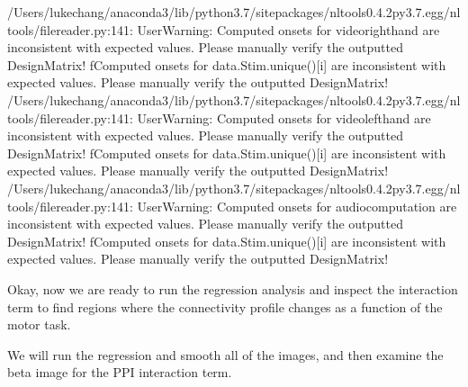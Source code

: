 \documentclass[letterpaper,10pt,english]{sphinxmanual}
\begin{document}
\begin{sphinxVerbatim}[commandchars=\\\{\}]
/Users/lukechang/anaconda3/lib/python3.7/site\PYGZhy{}packages/nltools\PYGZhy{}0.4.2\PYGZhy{}py3.7.egg/nltools/file\PYGZus{}reader.py:141: UserWarning: Computed onsets for video\PYGZus{}right\PYGZus{}hand are inconsistent with expected values. Please manually verify the outputted Design\PYGZus{}Matrix!
  f\PYGZdq{}Computed onsets for \PYGZob{}data.Stim.unique()[i]\PYGZcb{} are inconsistent with expected values. Please manually verify the outputted Design\PYGZus{}Matrix!\PYGZdq{}
/Users/lukechang/anaconda3/lib/python3.7/site\PYGZhy{}packages/nltools\PYGZhy{}0.4.2\PYGZhy{}py3.7.egg/nltools/file\PYGZus{}reader.py:141: UserWarning: Computed onsets for video\PYGZus{}left\PYGZus{}hand are inconsistent with expected values. Please manually verify the outputted Design\PYGZus{}Matrix!
  f\PYGZdq{}Computed onsets for \PYGZob{}data.Stim.unique()[i]\PYGZcb{} are inconsistent with expected values. Please manually verify the outputted Design\PYGZus{}Matrix!\PYGZdq{}
/Users/lukechang/anaconda3/lib/python3.7/site\PYGZhy{}packages/nltools\PYGZhy{}0.4.2\PYGZhy{}py3.7.egg/nltools/file\PYGZus{}reader.py:141: UserWarning: Computed onsets for audio\PYGZus{}computation are inconsistent with expected values. Please manually verify the outputted Design\PYGZus{}Matrix!
  f\PYGZdq{}Computed onsets for \PYGZob{}data.Stim.unique()[i]\PYGZcb{} are inconsistent with expected values. Please manually verify the outputted Design\PYGZus{}Matrix!\PYGZdq{}
\end{sphinxVerbatim}

\noindent{}

Okay, now we are ready to run the regression analysis and inspect the interaction term to find regions where the connectivity profile changes as a function of the motor task.

We will run the regression and smooth all of the images, and then examine the beta image for the PPI interaction term.

\begin{sphinxVerbatim}[commandchars=\\\{\}]
  
  

  \PYG{p}{[}\PYG{p}{]}\PYG{p}{[}\PYG{p}{[}\PYG{p}{]}\PYG{p}{[}\PYG{p}{]}\PYG{p}{]}

\end{sphinxVerbatim}
\end{document}
